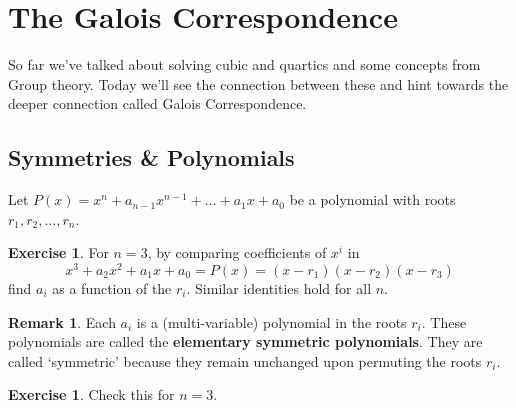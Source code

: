 \documentclass[reqno, 12pt, letter]{article}
\theoremstyle{plain}
\theoremstyle{definition}
\newtheorem{remark}[theorem]{Remark}
\newtheorem{exercise}[theorem]{Exercise}
\theoremstyle{remark}
\numberwithin{equation}{section}
\begin{document}
\newpage
\section{The Galois Correspondence}
So far we've talked about solving cubic and quartics and some concepts from Group theory. Today we'll see the connection between these and hint towards the deeper connection called Galois Correspondence.

	\subsection{Symmetries \& Polynomials}	
	
	Let $ P(x) = x^n + a_{n-1} x^{n-1} + \dots + a_1 x + a_0$ be a polynomial with roots $ r_1, r_2, \dots, r_n$.
	
	\begin{exercise}
		\label{exercise:elementary-symmetric-functions}
		For $ n=3$, by comparing coefficients of $ x^i$ in $$x^3 + a_2 x^2 + a_1 x + a_0 = P(x) = (x-r_1)(x-r_2)(x-r_3)$$ find $ a_i$ as a function of the $ r_i$.
		Similar identities hold for all $ n$. 
	\end{exercise}
	\begin{remark}
		Each $ a_i$ is a (multi-variable) polynomial in the roots $ r_i$. These polynomials are called the \textbf{elementary symmetric polynomials}. They are called `symmetric' because they remain unchanged upon permuting the roots $ r_i$.
	\end{remark}
	
	\begin{exercise}
		Check this for $ n=3$.
	\end{exercise}
	
\end{document}
